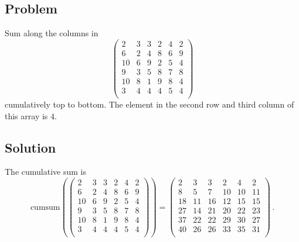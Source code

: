 \documentclass{article}
\begin{document}
\subsection{Problem}
Sum along the columns in $$\begin{pmatrix}
2&3&3&2&4&2\\6&2&4&8&6&9\\10&6&9&2&5&4\\9&3&5&8&7&8\\10&8&1&9&8&4\\3&4&4&4&5&4\\\end{pmatrix}
$$ cumulatively top to bottom. The element in the second row and third column of this array is $4$.
\subsection{Solution}
The cumulative sum is $$\text{cumsum}(\begin{pmatrix}
2&3&3&2&4&2\\6&2&4&8&6&9\\10&6&9&2&5&4\\9&3&5&8&7&8\\10&8&1&9&8&4\\3&4&4&4&5&4\\\end{pmatrix}
) = \begin{pmatrix}
2&3&3&2&4&2\\8&5&7&10&10&11\\18&11&16&12&15&15\\27&14&21&20&22&23\\37&22&22&29&30&27\\40&26&26&33&35&31\\\end{pmatrix}
\,.$$
\end{document}
